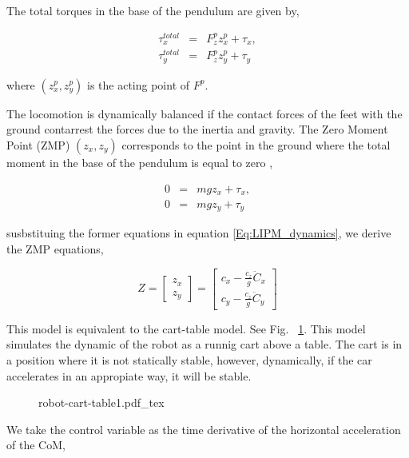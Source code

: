 The total torques in the base of the pendulum are given by,

\begin{eqnarray*}
\label{Eq:LIPM_total_torques}
\tau^{total}_{x} &=& F^p_z z^p_x + \tau_x, \\
\tau^{total}_{y} &=& F^p_z z^p_y + \tau_y
\end{eqnarray*}

where $(z^p_x, z^p_y)$ is the acting point of $F^p$.

The locomotion is dynamically balanced if the contact forces of the feet with the ground contarrest the forces due to the inertia and gravity. The Zero Moment Point (ZMP) $(z_x,z_y)$ corresponds to the point in the ground where the total moment in the base of the pendulum is equal to zero \citep{Vukobratovic1972,Vukobratovic2004},

\begin{eqnarray}
0 &=& m g z_x + \tau_x, \\
0 &=& m g z_y + \tau_y
\end{eqnarray}

susbstituing the former equations in equation \ref{Eq:LIPM_dynamics}, we derive the ZMP equations,

\begin{equation}
\label{Eq:LIPM_ZMP}
Z = 
\left[
\begin{matrix}
z_x \\ z_y
\end{matrix}
\right] = 
\left[
\begin{matrix}
c_x - \frac{c_z}{g}\ddot{C}_x \\ c_y - \frac{c_z}{g}\ddot{C}_y
\end{matrix}
\right]
\end{equation}

This model is equivalent to the cart-table model. See Fig. ~\ref{Fig:Inverted-Pendulum-Cart-Table}. This model simulates the dynamic of the robot as a runnig cart above a table. The cart is in a position where it is not statically stable, however, dynamically, if the car accelerates in an appropiate way, it will be stable.

\begin{figure}
  \centering
      {\def\svgwidth{0.5\columnwidth}
        
                   {robot-cart-table1.pdf_tex}}
      \caption[]{}
      \label{Fig:Inverted-Pendulum-Cart-Table}
\end{figure}

We take the control variable as the time derivative of the horizontal acceleration of the CoM,

